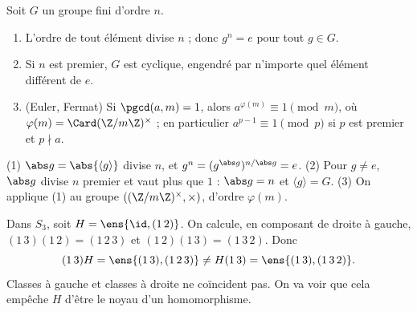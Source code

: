 \begin{corollaire}[Conséquences]\label{cor-lagrange}
Soit $G$ un groupe fini d'ordre $n$.
\begin{enumerate}
\item L'ordre de tout élément divise $n$ ; donc $g^n=e$ pour tout $g\in G$.
\item Si $n$ est premier, $G$ est cyclique, engendré par n'importe quel élément différent de $e$.
\item (Euler, Fermat) Si $\pgcd(a,m)=1$, alors $a^{\varphi(m)}\equiv1\pmod m$, où $\varphi(m)=\Card(\Z/m\Z)^\times$ ; en particulier $a^{p-1}\equiv1\pmod p$ si $p$ est premier et $p\nmid a$.
\end{enumerate}
\end{corollaire}
\begin{preuve}
(1) $\abs g=\abs{\langle g\rangle}$ divise $n$, et $g^n=(g^{\abs g})^{n/\abs g}=e$. (2) Pour $g\neq e$, $\abs g$ divise $n$ premier et vaut plus que $1$ : $\abs g=n$ et $\langle g\rangle=G$. (3) On applique (1) au groupe $((\Z/m\Z)^\times,\times)$, d'ordre $\varphi(m)$.
\end{preuve}
\begin{exemple}\label{ex-s3-h}
Dans $S_3$, soit $H=\ens{\id,(1\,2)}$. On calcule, en composant de droite à gauche, $(1\,3)(1\,2)=(1\,2\,3)$ et $(1\,2)(1\,3)=(1\,3\,2)$. Donc
\[(1\,3)H=\ens{(1\,3),(1\,2\,3)}\neq H(1\,3)=\ens{(1\,3),(1\,3\,2)}.\]
Classes à gauche et classes à droite ne coïncident pas. On va voir que cela empêche $H$ d'être le noyau d'un homomorphisme.
\end{exemple}

